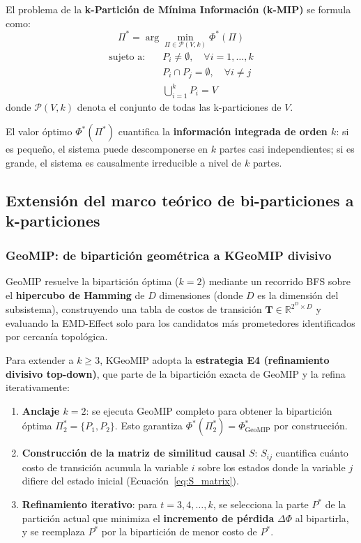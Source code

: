 El problema de la \textbf{k-Partición de Mínima Información (k-MIP)} se formula como:
\begin{equation}
  \Pi^* = \arg\min_{\Pi \in \mathcal{P}(V,k)} \Phi^*(\Pi)
  \label{eq:kmip}
\end{equation}
\begin{align*}
  \text{sujeto a:} \quad
  & P_i \neq \emptyset, \quad \forall i = 1, \ldots, k \\
  & P_i \cap P_j = \emptyset, \quad \forall i \neq j \\
  & \bigcup_{i=1}^{k} P_i = V
\end{align*}
donde $\mathcal{P}(V, k)$ denota el conjunto de todas las k-particiones de $V$.

El valor óptimo $\Phi^*(\Pi^*)$ cuantifica la \textbf{información integrada de orden $k$}: si
es pequeño, el sistema puede descomponerse en $k$ partes casi independientes; si es grande,
el sistema es causalmente irreducible a nivel de $k$ partes.

\subsection{Extensión del marco teórico de bi-particiones a k-particiones}

\subsubsection*{GeoMIP: de bipartición geométrica a KGeoMIP divisivo}

GeoMIP resuelve la bipartición óptima ($k=2$) mediante un recorrido BFS sobre el
\textbf{hipercubo de Hamming} de $D$ dimensiones (donde $D$ es la dimensión del subsistema),
construyendo una tabla de costos de transición $\mathbf{T} \in \mathbb{R}^{2^D \times D}$ y
evaluando la EMD-Effect solo para los candidatos más prometedores identificados por cercanía
topológica.

Para extender a $k \geq 3$, KGeoMIP adopta la \textbf{estrategia E4 (refinamiento divisivo
top-down)}, que parte de la bipartición exacta de GeoMIP y la refina iterativamente:

\begin{enumerate}
  \item \textbf{Anclaje $k=2$}: se ejecuta GeoMIP completo para obtener la bipartición óptima
        $\Pi_2^* = \{P_1, P_2\}$. Esto garantiza $\Phi^*(\Pi_2^*) = \Phi^*_{\text{GeoMIP}}$ por
        construcción.
  \item \textbf{Construcción de la matriz de similitud causal $S$}: $S_{ij}$ cuantifica
        cuánto costo de transición acumula la variable $i$ sobre los estados donde la variable
        $j$ difiere del estado inicial (Ecuación~\ref{eq:S_matrix}).
  \item \textbf{Refinamiento iterativo}: para $t = 3, 4, \ldots, k$, se selecciona la parte
        $P^*$ de la partición actual que minimiza el \textbf{incremento de pérdida} $\Delta\Phi$
        al bipartirla, y se reemplaza $P^*$ por la bipartición de menor costo de $P^*$.
\end{enumerate}

